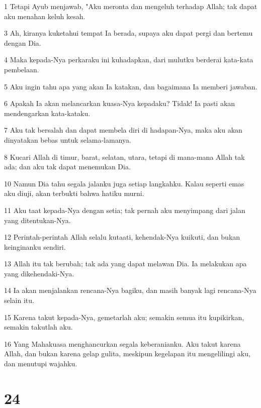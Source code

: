 \par 1 Tetapi Ayub menjawab, "Aku meronta dan mengeluh terhadap Allah; tak dapat aku menahan keluh kesah.
\par 3 Ah, kiranya kuketahui tempat Ia berada, supaya aku dapat pergi dan bertemu dengan Dia.
\par 4 Maka kepada-Nya perkaraku ini kuhadapkan, dari mulutku berderai kata-kata pembelaan.
\par 5 Aku ingin tahu apa yang akan Ia katakan, dan bagaimana Ia memberi jawaban.
\par 6 Apakah Ia akan melancarkan kuasa-Nya kepadaku? Tidak! Ia pasti akan mendengarkan kata-kataku.
\par 7 Aku tak bersalah dan dapat membela diri di hadapan-Nya, maka aku akan dinyatakan bebas untuk selama-lamanya.
\par 8 Kucari Allah di timur, barat, selatan, utara, tetapi di mana-mana Allah tak ada; dan aku tak dapat menemukan Dia.
\par 10 Namun Dia tahu segala jalanku juga setiap langkahku. Kalau seperti emas aku diuji, akan terbukti bahwa hatiku murni.
\par 11 Aku taat kepada-Nya dengan setia; tak pernah aku menyimpang dari jalan yang ditentukan-Nya.
\par 12 Perintah-perintah Allah selalu kutaati, kehendak-Nya kuikuti, dan bukan keinginanku sendiri.
\par 13 Allah itu tak berubah; tak ada yang dapat melawan Dia. Ia melakukan apa yang dikehendaki-Nya.
\par 14 Ia akan menjalankan rencana-Nya bagiku, dan masih banyak lagi rencana-Nya selain itu.
\par 15 Karena takut kepada-Nya, gemetarlah aku; semakin semua itu kupikirkan, semakin takutlah aku.
\par 16 Yang Mahakuasa menghancurkan segala keberanianku. Aku takut karena Allah, dan bukan karena gelap gulita, meskipun kegelapan itu mengelilingi aku, dan menutupi wajahku.

\chapter{24}

